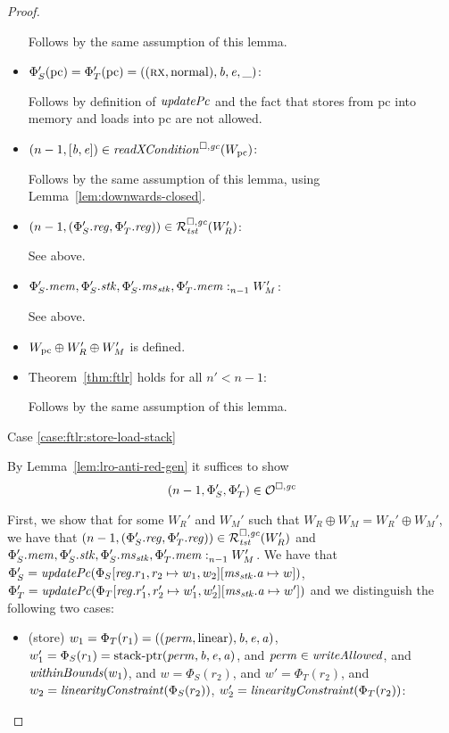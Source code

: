 \begin{proof}
\begin{itemize}
    Follows by the same assumption of this lemma.

  \item $\Phi_S'(\pcreg) = \Phi_T'(\pcreg) = ((\rx,\normal),\baddr,\eaddr,\_)$:

    Follows by definition of $\updPcAddr{}$ and the fact that stores from pc into memory and loads into pc are not allowed.

  \item $\npair[n-1]{[\baddr,\eaddr]} \in \xReadCond{W_\pcreg}$:

    Follows by the same assumption of this lemma, using Lemma~\ref{lem:downwards-closed}.

  \item $\npair[n-1]{(\Phi_S'.\reg,\Phi_T'.\reg)} \in \lrrg{\trust}(W_R')$:

    See above.

  \item $\memSat[n-1]{\Phi_S'.\mem,\Phi_S'.\stk,\Phi_S'.\ms_\stk,\Phi_T'.\mem}{W_M'}$:

    See above.

  \item $W_\pcreg \oplus W_R' \oplus W_M'$ is defined.

  \item Theorem~\ref{thm:ftlr} holds for all $n' < n-1$:

    Follows by the same assumption of this lemma.
  \end{itemize}

  Case \ref{case:ftlr:store-load-stack}

  By Lemma~\ref{lem:lro-anti-red-gen} it suffices to show
  \[
    \npair[n-1]{\Phi_S',\Phi_T'} \in \lro
  \]

  First, we show that for some $W_R'$ and $W_M'$ such that $W_R \oplus W_M = W_R' \oplus W_M'$, we have that $\npair[n-1]{(\Phi_S'.\reg,\Phi_T'.\reg)} \in \lrrg{\trust}(W_R')$ and $\memSat[n-1]{\Phi_S'.\mem,\Phi_S'.\stk,\Phi_S'.\ms_\stk,\Phi_T'.\mem}{W_M'}$.
  We have that $\Phi_S' = \updPcAddr{\Phi_S\updReg{r_1,r_2}{w_1,w_2}\update{\ms_\stk.\aaddr}{w}}$, $\Phi_T' = \updPcAddr{\Phi_T\updReg{r_1',r_2'}{w_1',w_2'}\update{\ms_\stk.\aaddr}{w'}}$ and we distinguish the following two cases:
  \begin{itemize}
  \item (store) $w_1 = \Phi_T(r_1) =
        ((\perm,\linear),\baddr,\eaddr,\aaddr)$, $w_1' = \Phi_S(r_1) =
        \stkptr{\perm,\baddr,\eaddr,\aaddr}$, and $\perm \in \writeAllowed{}$, and $\withinBounds{w_1}$, and $w = \Phi_S(r_2)$, and $w' = \Phi_T(r_2)$, and $w_2 = \linCons{\Phi_S(r_2)}$, $w_2' = \linCons{\Phi_T(r_2)}$:


\end{itemize}
\end{proof}
